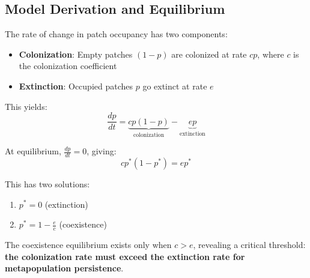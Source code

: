 \documentclass[11pt,a4paper]{article}
\begin{document}
\subsection{Model Derivation and Equilibrium}

The rate of change in patch occupancy has two components:
\begin{itemize}
\item \textbf{Colonization}: Empty patches $(1-p)$ are colonized at rate $cp$, where $c$ is the colonization coefficient
\item \textbf{Extinction}: Occupied patches $p$ go extinct at rate $e$
\end{itemize}

This yields:
\begin{equation}
\frac{dp}{dt} = \underbrace{cp(1-p)}_{\text{colonization}} - \underbrace{ep}_{\text{extinction}}
\end{equation}

At equilibrium, $\frac{dp}{dt} = 0$, giving:
\begin{equation}
cp^*(1-p^*) = ep^*
\end{equation}

This has two solutions:
\begin{enumerate}
\item $p^* = 0$ (extinction)
\item $p^* = 1 - \frac{e}{c}$ (coexistence)
\end{enumerate}

The coexistence equilibrium exists only when $c > e$, revealing a critical threshold: \textbf{the colonization rate must exceed the extinction rate for metapopulation persistence}.
\end{document}
